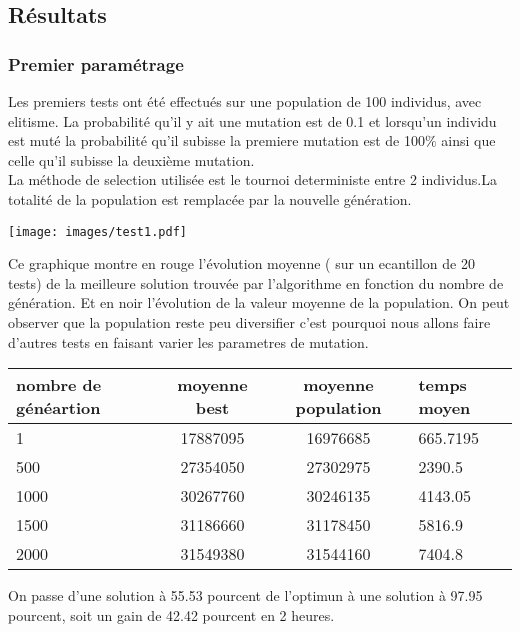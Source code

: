 \documentclass[a4paper]{report}
\begin{document}
\subsection{Résultats}
\subsubsection*{Premier paramétrage}
Les premiers tests ont été effectués sur une population de 100 individus, avec elitisme. La probabilité qu'il y ait une mutation est de 0.1 et lorsqu'un individu est muté la probabilité qu'il subisse la premiere mutation est de 100$\%$ ainsi que celle qu'il subisse la deuxième mutation.\\
La méthode de selection utilisée est le tournoi deterministe entre 2 individus.La totalité de la population est remplacée par la nouvelle génération.
\begin{center}
\texttt{[image: images/test1.pdf]}
\end{center}
Ce graphique montre en rouge l'évolution moyenne ( sur un ecantillon de 20 tests) de la  meilleure solution trouvée par l'algorithme en fonction du nombre de génération. Et en noir l'évolution de la valeur moyenne de la population. On peut observer que la population reste peu diversifier c'est pourquoi nous allons faire d'autres tests en faisant varier les parametres de mutation.\\
\begin{tabular}{|l|c|c|l|}
  \hline
  nombre de généartion &moyenne best &moyenne population&temps moyen\\

  \hline
 1 &17887095&16976685&665.7195\\
  \hline
500 & 27354050  &  27302975 &  2390.5
\\
  \hline
  1000& 30267760&30246135&4143.05
\\
  \hline
  1500 &31186660& 31178450&5816.9

\\
  \hline
 2000 & 31549380&31544160&7404.8 \\
  \hline


\end{tabular}
On passe d'une solution à 55.53 pourcent de l'optimun à une solution à 97.95 pourcent, soit un gain de 42.42 pourcent en 2 heures.
\end{document}

